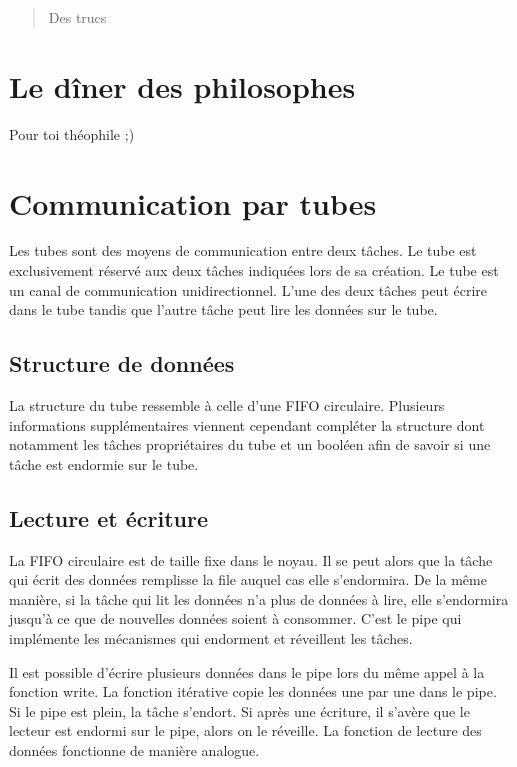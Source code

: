 \begin{abstract}
Des trucs
\end{abstract}

\section{Le dîner des philosophes}
Pour toi théophile ;)

\section{Communication par tubes}
Les tubes sont des moyens de communication entre deux tâches. Le tube est exclusivement réservé aux deux tâches indiquées lors de sa création.
Le tube est un canal de communication unidirectionnel. L'une des deux tâches peut écrire dans le tube tandis que l'autre tâche peut lire les données sur le tube.

\subsection{Structure de données}
La structure du tube ressemble à celle d'une FIFO circulaire. Plusieurs informations supplémentaires viennent cependant compléter la structure dont notamment les tâches propriétaires du tube et un booléen afin de savoir si une tâche est endormie sur le tube.


\subsection{Lecture et écriture}
La FIFO circulaire est de taille fixe dans le noyau. Il se peut alors que la tâche qui écrit des données remplisse la file auquel cas elle s'endormira.
De la même manière, si la tâche qui lit les données n'a plus de données à lire, elle s'endormira jusqu'à ce que de nouvelles données soient à consommer.
C'est le pipe qui implémente les mécanismes qui endorment et réveillent les tâches.

Il est possible d'écrire plusieurs données dans le pipe lors du même appel à la fonction write. La fonction itérative copie les données une par une dans le pipe. Si le pipe est plein, la tâche s'endort. Si après une écriture, il s'avère que le lecteur est endormi sur le pipe, alors on le réveille.
La fonction de lecture des données fonctionne de manière analogue.
